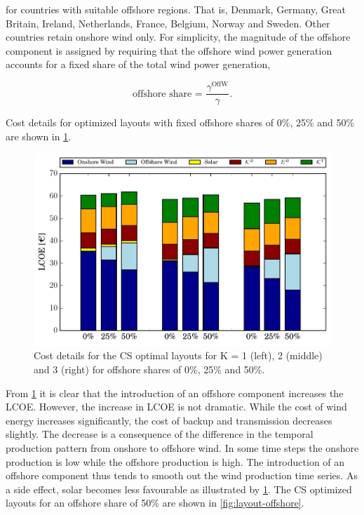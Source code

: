 \documentclass[a4paper, 12pt, sort&compress]{elsarticle}%
\begin{document}
for countries with suitable offshore regions. That is, Denmark,
Germany, Great Britain, Ireland, Netherlands, France, Belgium, Norway
and Sweden. Other countries retain onshore wind only. For simplicity,
the magnitude of the offshore component is assigned by requiring that
the offshore wind power generation accounts for a fixed share of the
total wind power generation,

\begin{equation}
  \label{eq:12}
  \text{offshore share = }\frac{\gamma^{\text{OffW}}}{\gamma}.
\end{equation}

Cost details for optimized layouts with fixed offshore shares of 0\%, 25\% and
50\% are shown in \cref{fig:cost-offshore}.

\begin{figure}[h!]
  \centering
  \includegraphics[width = \columnwidth]{costOffshoreVE50}
  \caption{Cost details for the CS optimal layouts for K = 1 (left),
    2 (middle) and 3 (right) for offshore shares of 0\%, 25\% and 50\%.}
  \label{fig:cost-offshore}
\end{figure}

From \cref{fig:cost-offshore} it is clear that the introduction of an
offshore component increases the LCOE. However, the increase in LCOE
is not dramatic. While the cost of wind energy increases
significantly, the cost of backup and transmission decreases
slightly. The decrease is a consequence of the difference in the
temporal production pattern from onshore to offshore wind. In some
time steps the onshore production is low while the offshore production
is high. The introduction of an offshore component thus tends to
smooth out the wind production time series. As a side effect, solar
becomes less favourable as illustrated by
\cref{fig:cost-offshore}. The CS optimized layouts for an offshore
share of 50\% are shown in \cref{fig:layout-offshore}.
\end{document}
